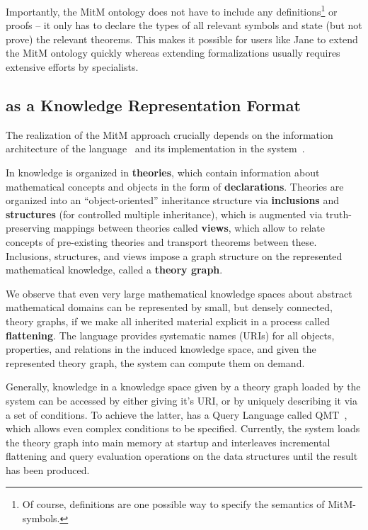 Importantly, the MitM ontology does not have to include any definitions\footnote{Of course, definitions are one possible way to specify the semantics of MitM-symbols.} or proofs -- it only has to declare the types of all relevant symbols and state (but not prove) the relevant theorems.
This makes it possible for users like Jane to extend the MitM ontology quickly whereas extending formalizations usually requires extensive efforts by specialists.

\subsection{\ommt as a Knowledge Representation Format}\label{sec:ommt}

The realization of the MitM approach crucially depends on the information architecture of the \ommt language~\cite{Kohlhase:OMDoc1.2,RabKoh:WSMSML13} and its implementation in the \mmt system~\cite{Rabe:MAGMS13,uniformal:on}.

In \ommt knowledge is organized in \textbf{theories}, which contain information about mathematical concepts and objects in the form of \textbf{declarations}.
Theories are organized into an ``object-oriented'' inheritance structure via \textbf{inclusions} and \textbf{structures} (for controlled multiple inheritance), which is augmented via truth-preserving mappings between theories called \textbf{views}, which allow to relate concepts of pre-existing theories and transport theorems between these.
Inclusions, structures, and views impose a graph structure on the represented mathematical knowledge, called a \textbf{theory graph}.

We observe that even very large mathematical knowledge spaces about abstract mathematical domains can be represented by small, but densely connected, theory graphs, if we make all inherited material explicit in a process called \textbf{flattening}. The \ommt language provides systematic names (\mmt URIs) for all objects, properties, and relations in the induced knowledge space, and given the represented theory graph, the \mmt system can compute them on demand.

Generally, knowledge in a knowledge space given by a theory graph loaded by the \mmt system can be accessed by either giving it's \mmt URI, or by uniquely describing it via a set of conditions. 
To achieve the latter, \mmt has a Query Language called QMT~\cite{Rabe:qlfml12}, which allows even complex conditions to be specified. 
Currently, the \mmt system loads the theory graph into main memory at startup and interleaves incremental flattening and query evaluation operations on the \mmt data structures until the result has been produced. 

